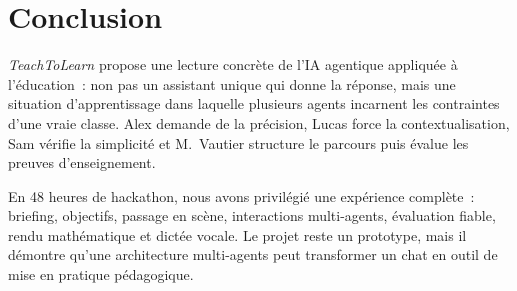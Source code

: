 \documentclass[11pt,a4paper]{article}
\begin{document}
\section{Conclusion}

\textit{TeachToLearn} propose une lecture concrète de l'IA agentique appliquée à l'éducation~: non pas un assistant unique qui donne la réponse, mais une situation d'apprentissage dans laquelle plusieurs agents incarnent les contraintes d'une vraie classe. Alex demande de la précision, Lucas force la contextualisation, Sam vérifie la simplicité et M.~Vautier structure le parcours puis évalue les preuves d'enseignement.

En 48 heures de hackathon, nous avons privilégié une expérience complète~: briefing, objectifs, passage en scène, interactions multi-agents, évaluation fiable, rendu mathématique et dictée vocale. Le projet reste un prototype, mais il démontre qu'une architecture multi-agents peut transformer un chat en outil de mise en pratique pédagogique.
\end{document}
